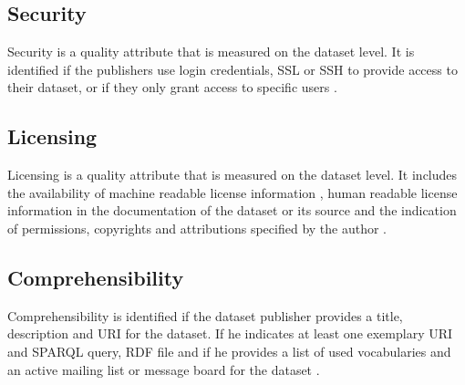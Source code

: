 \documentclass[onecolumn, crcready]{iosart2c}
\begin{document}
\subsection{Security}

Security is a quality attribute that is measured on the dataset level. It is identified if the publishers use login credentials, SSL or SSH to provide access to their dataset, or if they only grant access to specific users \cite{Framework2012}.

\subsection{Licensing}

Licensing is a quality attribute that is measured on the dataset level. It includes the availability of machine readable license information \cite{Hogan:2012:ESL:2263498.2264570}, human readable license information in the documentation of the dataset or its source \cite{Hogan:2012:ESL:2263498.2264570} and the indication of permissions, copyrights and attributions specified by the author \cite{Framework2012}.

\subsection{Comprehensibility}

Comprehensibility is identified if the dataset publisher provides a title, description and URI for the dataset. If he indicates at least one exemplary URI and SPARQL query, RDF file and if he provides a list of used vocabularies and an active mailing list or message board for the dataset \cite{flemming2010}.
\end{document}

